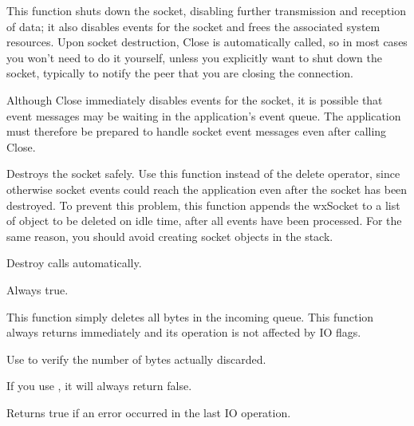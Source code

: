 
This function shuts down the socket, disabling further transmission and
reception of data; it also disables events for the socket and frees the
associated system resources. Upon socket destruction, Close is automatically
called, so in most cases you won't need to do it yourself, unless you
explicitly want to shut down the socket, typically to notify the peer
that you are closing the connection.


Although Close immediately disables events for the socket, it is possible
that event messages may be waiting in the application's event queue. The
application must therefore be prepared to handle socket event messages
even after calling Close.

%
%
\label{wxsocketbasedestroy}


Destroys the socket safely. Use this function instead of the delete operator,
since otherwise socket events could reach the application even after the
socket has been destroyed. To prevent this problem, this function appends
the wxSocket to a list of object to be deleted on idle time, after all
events have been processed. For the same reason, you should avoid creating
socket objects in the stack.

Destroy calls  automatically.


Always true.

%
%
\label{wxsocketbasediscard}


This function simply deletes all bytes in the incoming queue. This function
always returns immediately and its operation is not affected by IO flags.

Use  to verify the number of bytes actually discarded.

If you use , it will always return false.

%
%
\label{wxsocketbaseerror}


Returns true if an error occurred in the last IO operation.

